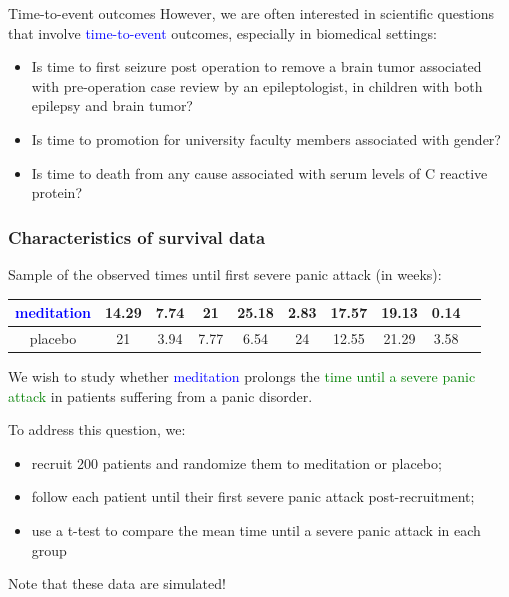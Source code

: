 \documentclass[10pt,t]{beamer}
\begin{document}
\begin{frame}{Time-to-event outcomes}
However, we are often interested in scientific questions that involve \textcolor{blue}{time-to-event} outcomes, especially in biomedical settings:
\begin{itemize}
\item Is time to first seizure post operation to remove a brain tumor associated with pre-operation case review by an epileptologist, in children with both epilepsy and brain tumor?
\item Is time to promotion for university faculty members associated with gender?
\item Is time to death from any cause associated with serum levels of C reactive protein?
\end{itemize}
\end{frame}

\begin{frame}
\frametitle{Characteristics of survival data}
{\fontsize{7.5pt}{7.2}\selectfont
Sample of the observed times until first severe panic attack (in weeks):
\begin{tabular}{|c|c|c|c|c|c|c|c|c|c|}
\hline
\textcolor{blue}{meditation} & 14.29 & 7.74 & 21 & 25.18 & 2.83 & 17.57 & 19.13 & 0.14  \\
\hline
placebo & 21 & 3.94 & 7.77 & 6.54 & 24 & 12.55 & 21.29 & 3.58 \\
\hline
\end{tabular}
}

\vspace{0.5cm}
We wish to study whether \textcolor{blue}{meditation} prolongs the \textcolor{green}{time until a severe panic attack} in patients suffering from a panic disorder.

To address this question, we: 
\begin{itemize}
\item recruit 200 patients and randomize them to meditation or placebo;
\item follow each patient until their first severe panic attack post-recruitment;
\item use a t-test to compare the mean time until a severe panic attack in each group
\end{itemize}
\vfill
\begin{footnotesize}
	Note that these data are simulated!
\end{footnotesize}
\end{frame}
\end{document}
